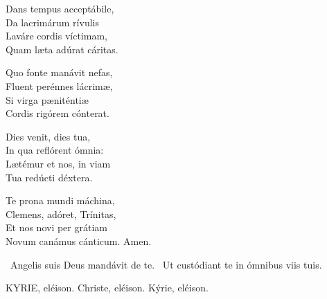 Dans tempus acceptábile,\\
Da lacrimárum rívulis\\
Laváre cordis víctimam,\\
Quam læta adúrat cáritas.

Quo fonte manávit nefas,\\
Fluent perénnes lácrimæ,\\
Si virga pæniténtiæ\\
Cordis rigórem cónterat.

Dies venit, dies tua,\\
In qua reflórent ómnia:\\
Lætémur et nos, in viam\\
Tua redúcti déxtera.

Te prona mundi máchina,\\
Clemens, adóret, Trínitas,\\
Et nos novi per grátiam\\
Novum canámus cánticum. Amen.

\V\ Angelis suis Deus mandávit de te. \R\ Ut custódiant te in ómnibus viis tuis.




KYRIE, eléison. Christe, eléison. Kýrie, eléison.

